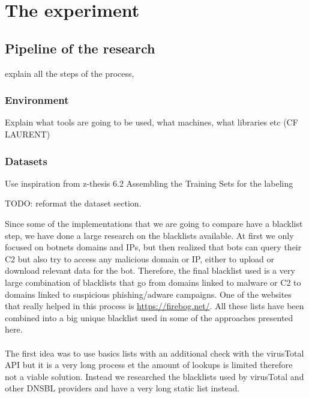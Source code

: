 
\chapter{The experiment} %

\label{experiment}
\section{Pipeline of the research}

explain all the steps of the process, 

\subsection{Environment}

Explain what tools are going to be used, what machines, what libraries etc (CF LAURENT)

\subsection{Datasets}

Use inspiration from z-thesis 6.2 Assembling the Training Sets for the labeling


TODO: reformat the dataset section.

Since some of the implementations that we are going to compare have a blacklist step, we have done a large research on the blacklists available. At first we only focused on botnets domains and IPs, but then realized that bots can query their C2 but also try to access any malicious domain or IP, either to upload or download relevant data for the bot. Therefore, the final blacklist used is a very large combination of blacklists that go from domains linked to malware or C2 to domains linked to suspicious phishing/adware campaigns. One of the websites that really helped in this process is \url{https://firebog.net/}. All these lists have been combined into a big unique blacklist used in some of the approaches presented here.\\\\

The first idea was to use basics lists with an additional check with the virusTotal API but it is a very long process et the amount of lookups is limited therefore not a viable solution. Instead we researched the blacklists used by virusTotal and other DNSBL providers and have a very long static list instead.


